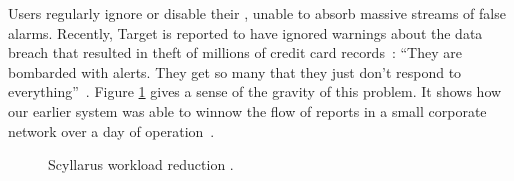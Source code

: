 Users regularly ignore or disable their {\idses}, unable to absorb
massive streams of false alarms.
Recently, Target is reported to have ignored warnings about the
data breach that resulted in theft of millions of credit
card records~\cite{TargetIgnoredIDS}:
``They are bombarded with alerts. They get so many that they just don't respond
to everything''~\cite{finkle14:_target}.
Figure
\ref{fig:workloadReduction} gives a sense of the gravity of this
problem. It shows how our earlier system was able to winnow
the 
flow of reports in a small corporate network over a day of operation~.
\begin{figure}[t]
  \centering
  \caption{Scyllarus workload reduction%
.}
  \label{fig:workloadReduction}
\end{figure}





